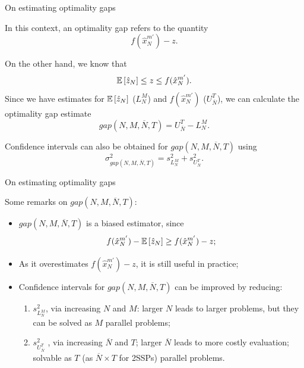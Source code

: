 \begin{frame}{On estimating optimality gaps}

	In this context, an \alert{optimality gap} refers to the quantity
	$$
		f(\hat{x}^{m'}_N) - z.
	$$
	
	\pause
	On the other hand, we know that
	$$
		  \mathbb{E}\left[ \hat{z}_N \right] \le z \le f(\hat{x}^{m'}_N).
	$$
	Since we have estimates for $\mathbb{E}\left[ \hat{z}_N \right]$ ($L_N^M$) and $f(\hat{x}^{m'}_N)$ ($U_{\overline{N}}^T$), we can calculate the \alert{optimality gap} estimate
	\begin{equation*}
		gap(N,M,\overline{N},T) = U_{\overline{N}}^T - L_N^M.
	\end{equation*}
	
	\pause
	Confidence intervals can also be obtained for $gap(N,M,\overline{N},T)$ using   
	$$
		\sigma^2_{gap(N,M,\overline{N},T)} = s^2_{L_N^M} + s^2_{U_{\overline{N}}^T}.
	$$ 
	

\end{frame}



\begin{frame}{On estimating optimality gaps}

Some remarks on $gap(N,M,\overline{N},T)$:
	\begin{itemize}[<+->]
		\item $gap(N,M,\overline{N},T)$	is a \alert{biased} estimator, since 
		$$
			f(\hat{x}^{m'}_N) - \mathbb{E}\left[ \hat{z}_N \right] \ge f(\hat{x}^{m'}_N) - z;
		$$
		\item As it overestimates $f(\hat{x}^{m'}_N) - z$, it is still useful in practice;
		\item Confidence intervals for $gap(N,M,\overline{N},T)$ can be \alert{improved} by reducing:
			\begin{enumerate}
				\item $s^2_{L_N^M}$, via increasing $N$ and $M$: larger $N$ leads to larger problems, but they can be solved as $M$ \alert{parallel} problems;
				\item $s^2_{U_{\overline{N}}^T}$	, via increasing $\overline{N}$ and $T$; larger $\overline{N}$ leads to more costly evaluation; solvable as $T$ (as $\overline{N} \times T$ for 2SSPs) parallel problems.
			\end{enumerate}
	\end{itemize}	
\end{frame}


